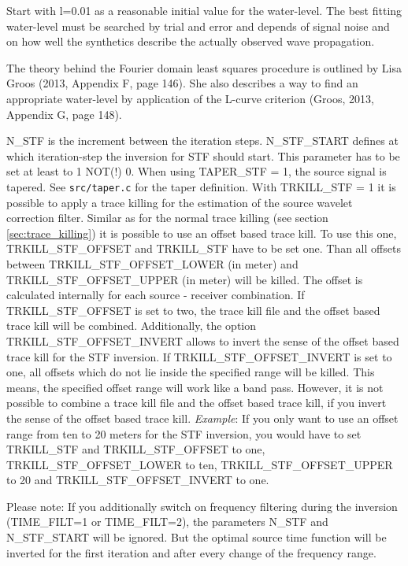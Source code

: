 Start with l=0.01 as a reasonable initial value for the water-level. The best fitting water-level must be searched by trial and error and depends of signal noise and on how well the synthetics describe the actually observed wave propagation.

The theory behind the Fourier domain least squares procedure is outlined by Lisa Groos (2013, Appendix F, page 146). She also describes a way to find an appropriate water-level by application of the L-curve criterion (Groos, 2013, Appendix G, page 148).
\newline

N\_STF is the increment between the iteration steps. N\_STF\_START defines at which iteration-step the inversion for STF should start. This parameter has to be set at least to 1 NOT(!) 0. When using TAPER\_STF = 1, the source signal is tapered. See \texttt{src/taper.c} for the taper definition. With TRKILL\_STF = 1 it is possible to apply a trace killing for the estimation of the source wavelet correction filter. Similar as for the normal trace killing (see section \ref{sec:trace_killing}) it is possible to use an offset based trace kill. To use this one, TRKILL\_STF\_OFFSET and TRKILL\_STF have to be set one. Than all offsets between TRKILL\_STF\_OFFSET\_LOWER (in meter) and TRKILL\_STF\_OFFSET\_UPPER (in meter) will be killed. The offset is calculated internally for each source - receiver combination. If TRKILL\_STF\_OFFSET is set to two, the trace kill file and the offset based trace kill will be combined. Additionally, the option TRKILL\_STF\_OFFSET\_INVERT allows to invert the sense of the offset based trace kill for the STF inversion. If TRKILL\_STF\_OFFSET\_INVERT is set to one, all offsets which do not lie inside the specified range will be killed. This means, the specified offset range will work like a band pass. However, it is not possible to combine a trace kill file and the offset based trace kill, if you invert the sense of the offset based trace kill. \textit{Example}: If you only want to use an offset range from ten to 20 meters for the STF inversion, you would have to set TRKILL\_STF and TRKILL\_STF\_OFFSET to one, TRKILL\_STF\_OFFSET\_LOWER to ten, TRKILL\_STF\_OFFSET\_UPPER to 20 and TRKILL\_STF\_OFFSET\_INVERT to one.
\newline

Please note: If you additionally switch on frequency filtering during the inversion (TIME\_FILT=1 or TIME\_FILT=2), the parameters N\_STF and N\_STF\_START will be ignored. But the optimal source time function will be inverted for the first iteration and after every change of the frequency range.

